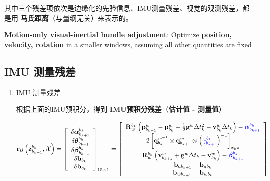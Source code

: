 \documentclass[12pt,a4paper]{article}
\begin{document}
其中三个残差项依次是边缘化的先验信息、IMU测量残差、视觉的观测残差，都是用 \textbf{马氏距离}（与量纲无关）来表示的。

\textbf{Motion-only visual-inertial bundle adjustment}: Optimize \textbf{position, velocity, rotation} in a smaller windows, assuming all other quantities are fixed

\subsection{IMU 测量残差}

\begin{enumerate}

\item IMU 测量残差

根据上面的IMU预积分，得到 \textbf{IMU预积分残差}（\textbf{估计值 - 测量值}）

\begin{equation}
\label{equ:residual_imu_origin}
\mathbf{r}_{\mathcal{B}}\left(\hat{\mathbf{z}}_{b_{k+1}}^{b_{k}}, \mathcal{X}\right) 
=
\left[\begin{array}{c}
{\delta \boldsymbol{\alpha}_{b_{k+1}}^{b_{k}}} \\ 
{\delta \boldsymbol{\theta}_{b_{k+1}}^{b_{k}}} \\
{\delta \boldsymbol{\beta}_{b_{k+1}}^{b_{k}}} \\ 
{\delta \mathbf{b}_{b_{k}}} \\ 
{\delta \mathbf{b}_{g_{k}}}
\end{array}\right]_{15 \times 1} 
= 
\left[\begin{array}{c}
{\mathbf{R}_{w}^{b_{k}}
\left(\mathbf{p}_{b_{k+1}}^{w}-\mathbf{p}_{b_{k}}^{w}+\frac{1}{2} \mathbf{g}^{w} \Delta t_{k}^{2}-\mathbf{v}_{b_{k}}^{w} \Delta t_{k}\right)-
\color{blue}{\boldsymbol{\alpha}_{b_{k+1}}^{b_{k}}}} \\ 
{2\left[\mathbf{q}_{b_{k}}^{w^{-1}} \otimes \mathbf{q}_{b_{k+1}}^{w} \otimes\left({\color{blue}{{\gamma}_{b_{k+1}}^{b_{k}}}}\right)^{-1}\right]_{x y z}} \\
{\mathbf{R}_{w}^{b_{k}}\left(\mathbf{v}_{b_{k+1}}^{w}+\mathbf{g}^{w} \Delta t_{k}-\mathbf{v}_{b_{k}}^{w}\right) - \color{blue}{\boldsymbol{\beta}}_{b_{k+1}}^{b_{k}}} \\  
{\mathbf{b}_{a b_{k+1}}-\mathbf{b}_{a b_{k}}} \\ 
{\mathbf{b}_{w b_{k+1}}-\mathbf{b}_{w b_{k}}}
\end{array}\right]
\end{equation}


\end{enumerate}
\end{document}
